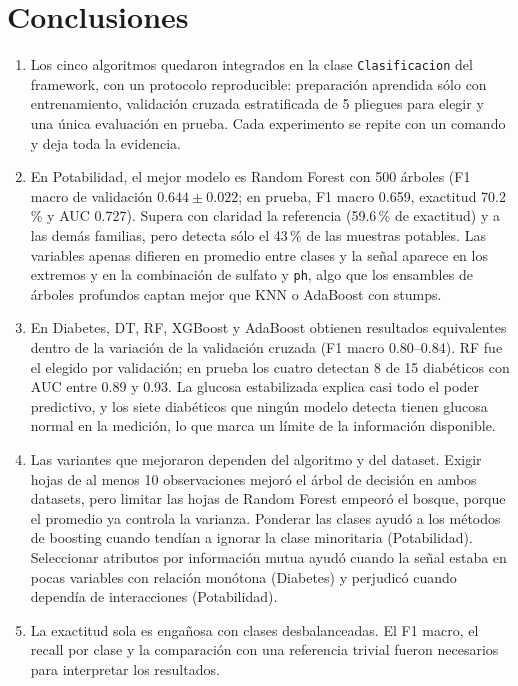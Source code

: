 \documentclass[11pt]{article}
\begin{document}
\section{Conclusiones}

\begin{enumerate}
\item Los cinco algoritmos quedaron integrados en la clase \texttt{Clasificacion} del
framework, con un protocolo reproducible: preparación aprendida sólo con
entrenamiento, validación cruzada estratificada de 5 pliegues para elegir y una única
evaluación en prueba. Cada experimento se repite con un comando y deja toda la evidencia.

\item En Potabilidad, el mejor modelo es Random Forest con 500 árboles (F1 macro de
validación $0.644\pm0.022$; en prueba, F1 macro 0.659, exactitud 70.2\,\% y AUC 0.727).
Supera con claridad la referencia (59.6\,\% de exactitud) y a las demás familias, pero
detecta sólo el 43\,\% de las muestras potables. Las variables apenas difieren en
promedio entre clases y la señal aparece en los extremos y en la combinación de sulfato
y \texttt{ph}, algo que los ensambles de árboles profundos captan mejor que KNN o
AdaBoost con stumps.

\item En Diabetes, DT, RF, XGBoost y AdaBoost obtienen resultados equivalentes dentro de
la variación de la validación cruzada (F1 macro 0.80--0.84). RF fue el elegido por
validación; en prueba los cuatro detectan 8 de 15 diabéticos con AUC entre 0.89 y 0.93.
La glucosa estabilizada explica casi todo el poder predictivo, y los siete diabéticos
que ningún modelo detecta tienen glucosa normal en la medición, lo que marca un límite
de la información disponible.

\item Las variantes que mejoraron dependen del algoritmo y del dataset. Exigir hojas de al menos
10 observaciones mejoró el árbol de decisión en ambos datasets, pero limitar las hojas
de Random Forest empeoró el bosque, porque el promedio ya controla la varianza. Ponderar
las clases ayudó a los métodos de boosting cuando tendían a ignorar la clase minoritaria
(Potabilidad). Seleccionar atributos por información mutua ayudó
cuando la señal estaba en pocas variables con relación monótona (Diabetes) y perjudicó
cuando dependía de interacciones (Potabilidad).

\item La exactitud sola es engañosa con clases desbalanceadas. El F1 macro, el recall
por clase y la comparación con una referencia trivial fueron necesarios para interpretar
los resultados.
\end{enumerate}
\end{document}
